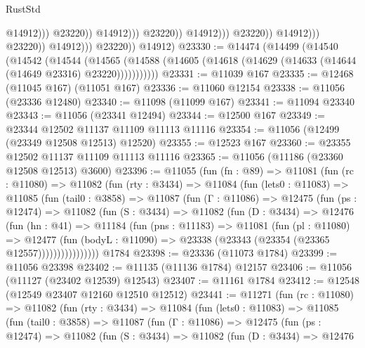 \begin{lexlean}{RustStd}
\begin{coremodule}
                                                        @14912)))
                                                  @23220))
                                              @14912)))
                                        @23220))
                                    @14912)))
                              @23220))
                          @14912)))
                    @23220))
                @14912)))
          @23220))
      @14912)
@23330 := @14474
    (@14499
      (@14540
        (@14542
          (@14544
            (@14565
              (@14588 (@14605 (@14618 (@14629 (@14633 (@14644 (@14649 @23316) @23220)))))))))))
@23331 := @11039 @167
@23335 := @12468 (@11045 @167) (@11051 @167)
@23336 := @11060 @12154
@23338 := @11056 (@23336 @12480)
@23340 := @11098 (@11099 @167)
@23341 := @11094 @23340
@23343 := @11056 (@23341 @12494)
@23344 := @12500 @167
@23349 := @23344 @12502 @11137 @11109 @11113 @11116
@23354 := @11056 (@12499 (@23349 @12508 @12513) @12520)
@23355 := @12523 @167
@23360 := @23355 @12502 @11137 @11109 @11113 @11116
@23365 := @11056 (@11186 (@23360 @12508 @12513) @3600)
@23396 := @11055
    (fun (fn : @89) =>
    @11081
      (fun (rc : @11080) =>
      @11082
        (fun (rty : @3434) =>
        @11084
          (fun (lets0 : @11083) =>
          @11085
            (fun (tail0 : @3858) =>
            @11087
              (fun (Γ : @11086) =>
              @12475
                (fun (ps : @12474) =>
                @11082
                  (fun (S : @3434) =>
                  @11082
                    (fun (D : @3434) =>
                    @12476
                      (fun (hn : @41) =>
                      @11184
                        (fun (pns : @11183) =>
                        @11081
                          (fun (pl : @11080) =>
                          @12477
                            (fun (bodyL : @11090) =>
                            @23338 (@23343 (@23354 (@23365 @12557))))))))))))))))
    @1784
@23398 := @23336 (@11073 @1784)
@23399 := @11056 @23398
@23402 := @11135 (@11136 @1784) @12157
@23406 := @11056 (@11127 (@23402 @12539) @12543)
@23407 := @11161 @1784
@23412 := @12548 (@12549 @23407 @12160 @12510 @12512)
@23441 := @11271
    (fun (rc : @11080) =>
    @11082
      (fun (rty : @3434) =>
      @11084
        (fun (lets0 : @11083) =>
        @11085
          (fun (tail0 : @3858) =>
          @11087
            (fun (Γ : @11086) =>
            @12475
              (fun (ps : @12474) =>
              @11082
                (fun (S : @3434) =>
                @11082
                  (fun (D : @3434) =>
                  @12476

\end{coremodule}
\end{lexlean}
